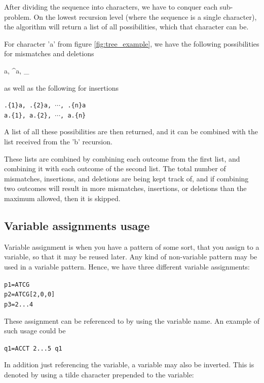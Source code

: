 \documentclass[12pt]{article}
\begin{document}
After dividing the sequence into characters, we have to conquer each sub-problem. On the lowest recursion level (where the sequence is a single character), the algorithm will return a list of all possibilities, which that character can be.

For character 'a' from figure \ref{fig:tree_example}, we have the following possibilities for mismatches and deletions

\begin{center}
	{a, \^{}a, \_}
\end{center}

as well as the following for insertions

\begin{center}
	\texttt{.\{1\}a, .\{2\}a, $\cdots$, .\{n\}a} \\
	\texttt{a.\{1\}, a.\{2\}, $\cdots$, a.\{n\}}
\end{center}

A list of all these possibilities are then returned, and it can be combined with the list received from the 'b' recursion.

These lists are combined by combining each outcome from the first list, and combining it with each outcome of the second list. The total number of mismatches, insertions, and deletions are being kept track of, and if combining two outcomes will result in more mismatches, insertions, or deletions than the maximum allowed, then it is skipped.


\subsection{Variable assignments usage}

Variable assignment is when you have a pattern of some sort, that you assign to a variable, so that it may be reused later. Any kind of non-variable pattern may be used in a variable pattern. Hence, we have three different variable assignments:

\texttt{p1=ATCG} \\
\texttt{p2=ATCG[2,0,0]} \\
\texttt{p3=2...4}

These assignment can be referenced to by using the variable name. An example of such usage could be

\texttt{q1=ACCT 2...5 q1}

In addition just referencing the variable, a variable may also be inverted. This is denoted by using a tilde character prepended to the variable:
\end{document}
